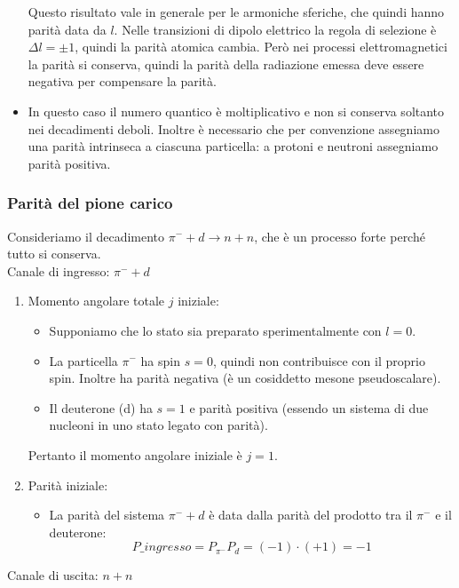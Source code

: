 \begin{itemize}
\begin{equation*}
    \end{equation*}
    Questo risultato vale in generale per le armoniche sferiche, che quindi hanno parità data da $l$. Nelle transizioni di dipolo elettrico la regola di selezione è $\Delta l=\pm 1$, quindi la parità atomica cambia. Però nei processi elettromagnetici la parità si conserva, quindi la parità della radiazione emessa deve essere negativa per compensare la parità. 
    \item In questo caso il numero quantico è moltiplicativo e non si conserva soltanto nei decadimenti deboli. Inoltre è necessario che per convenzione assegniamo una parità intrinseca a ciascuna particella: a protoni e neutroni assegniamo parità positiva.
\end{itemize}
\subsubsection{Parità del pione carico}
Consideriamo il decadimento $\pi^-+d\to n+n$, che è un processo forte perché tutto si conserva.\\
Canale di ingresso: $\pi^-+d$
\begin{enumerate}
    \item Momento angolare totale $j$ iniziale:
    \begin{itemize}
        \item Supponiamo che lo stato sia preparato sperimentalmente con $l=0$.
        \item La particella $\pi^-$ ha spin $s=0$, quindi non contribuisce con il proprio spin. Inoltre ha parità negativa (è un cosiddetto mesone pseudoscalare).
        \item Il deuterone (d) ha $s=1$ e parità positiva (essendo un sistema di due nucleoni in uno stato legato con parità).
    \end{itemize}
    Pertanto il momento angolare iniziale è $j=1$. 
    \item Parità iniziale:
    \begin{itemize}
        \item La parità del sistema $\pi^-+d$ è data dalla parità del prodotto tra il $\pi^-$ e il deuterone:
        \begin{equation*}
        P\_{ingresso}=P_{\pi^-}P_d=(-1)\cdot (+1)= -1
        \end{equation*}
    \end{itemize}
\end{enumerate}
Canale di uscita: $n+n$
